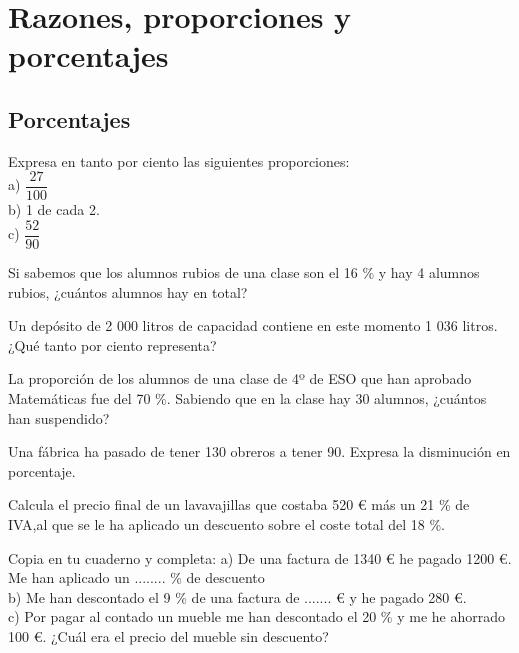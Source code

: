 \section{Razones, proporciones y porcentajes}

\subsection{Porcentajes}

\begin{ejer}
Expresa en tanto por ciento las siguientes proporciones: \\
a) $\dfrac{27}{100}$ \\
b) 1 de cada 2. \\
c) $\dfrac{52}{90}$
\end{ejer}

\begin{ejer}
Si sabemos que los alumnos rubios de una clase son el 16 \% y hay 4 alumnos rubios, ¿cuántos alumnos hay en total?
\end{ejer}

\begin{ejer}
Un depósito de 2 000 litros de capacidad contiene en este momento 1 036 litros. ¿Qué tanto por ciento representa?
\end{ejer}

\begin{ejer}
La proporción de los alumnos de una clase de 4º de ESO que han aprobado Matemáticas fue del 70 \%. Sabiendo que en la clase hay 30 alumnos, ¿cuántos han suspendido?
\end{ejer}

\begin{ejer}
Una fábrica ha pasado de tener 130 obreros a tener 90. Expresa la disminución en porcentaje.
\end{ejer}

\begin{ejer}
Calcula el precio final de un lavavajillas que costaba 520 € más un 21 \% de IVA,al que se le ha aplicado un descuento sobre el coste total del 18 \%.
\end{ejer}

\begin{ejer}
Copia en tu cuaderno y completa:
a) De una factura de 1340 € he pagado 1200 €. Me han aplicado un ........ \% de descuento \\
b) Me han descontado el 9 \% de una factura de ....... € y he pagado 280 €. \\
c) Por pagar al contado un mueble me han descontado el 20 \% y me he ahorrado 100 €. ¿Cuál era el precio del mueble sin descuento?
\end{ejer}

